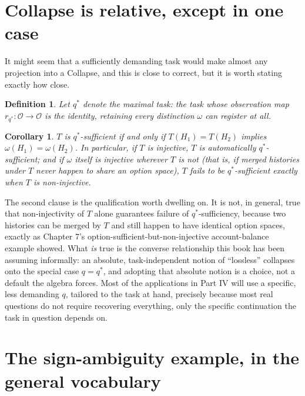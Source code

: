 \documentclass[11pt]{book}
\newtheorem{corollary}[theorem]{Corollary}
\newtheorem{definition}[theorem]{Definition}
\begin{document}
\section{Collapse is relative, except in one case}

It might seem that a sufficiently demanding task would make almost any projection into a Collapse, and this is close to correct, but it is worth stating exactly how close.

\begin{definition}
Let $q^\ast$ denote the \emph{maximal task}: the task whose observation map $r_{q^\ast}:\mathcal O\to\mathcal O$ is the identity, retaining every distinction $\omega$ can register at all.
\end{definition}

\begin{corollary}
\label{cor:maximal-task}
$T$ is $q^\ast$-sufficient if and only if $T(H_1)=T(H_2)$ implies $\omega(H_1)=\omega(H_2)$. In particular, if $T$ is injective, $T$ is automatically $q^\ast$-sufficient; and if $\omega$ itself is injective wherever $T$ is not (that is, if merged histories under $T$ never happen to share an option space), $T$ fails to be $q^\ast$-sufficient exactly when $T$ is non-injective.
\end{corollary}

The second clause is the qualification worth dwelling on. It is not, in general, true that non-injectivity of $T$ alone guarantees failure of $q^\ast$-sufficiency, because two histories can be merged by $T$ and still happen to have identical option spaces, exactly as Chapter 7's option-sufficient-but-non-injective account-balance example showed. What \emph{is} true is the converse relationship this book has been assuming informally: an absolute, task-independent notion of ``lossless'' collapses onto the special case $q=q^\ast$, and adopting that absolute notion is a choice, not a default the algebra forces. Most of the applications in Part IV will use a specific, less demanding $q$, tailored to the task at hand, precisely because most real questions do not require recovering everything, only the specific continuation the task in question depends on.

\section{The sign-ambiguity example, in the general vocabulary}
\end{document}
